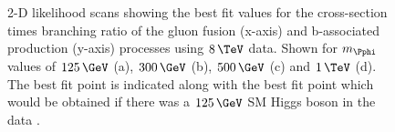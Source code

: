 \begin{figure}[tbh]

\caption[2-D likelihood scans showing the best fit values for the cross-section
times branching ratio of the gluon fusion (x-axis) and b-associated production
(y-axis) processes using $8\,\TeV$ data.]{2-D likelihood scans showing the best fit values for the cross-section
times branching ratio of the gluon fusion (x-axis) and b-associated production
(y-axis) processes using $8\,\TeV$ data. Shown for $m_{\Pphi}$ values of
$125\,\GeV$ (a), $300\,\GeV$ (b), $500\,\GeV$ (c) and
$1\,\TeV$ (d). The best fit point is indicated along with the best fit
point which would be obtained if there was a $125\,\GeV$ SM Higgs boson in the data \cite{HIG-13-021}.}
\label{fig:2Dlikelihood}
\end{figure}

